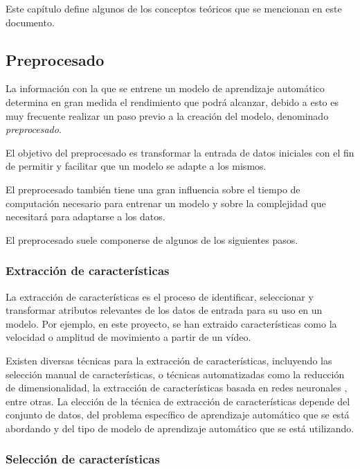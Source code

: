 \label{cha:Conceptos teóricos}

Este capítulo define algunos de los conceptos teóricos que se mencionan en este
documento.

\subsection{Preprocesado}

La información con la que se entrene un modelo de aprendizaje automático
determina en gran medida el rendimiento que podrá alcanzar, debido a esto es muy
frecuente realizar un paso previo a la creación del modelo, denominado
\textit{preprocesado}.

El objetivo del preprocesado es transformar la entrada de datos iniciales con el
fin de permitir y facilitar que un modelo se adapte a los mismos.

El preprocesado también tiene una gran influencia sobre el tiempo de computación
necesario para entrenar un modelo y sobre la complejidad que necesitará para
adaptarse a los datos.

El preprocesado suele componerse de algunos de los siguientes pasos.

\subsubsection{Extracción de características}

La extracción de características es el proceso de identificar, seleccionar y
transformar atributos relevantes de los datos de entrada para su uso en un
modelo. Por ejemplo, en este proyecto, se han extraido características como la
velocidad o amplitud de movimiento a partir de un vídeo.

Existen diversas técnicas para la extracción de características, incluyendo las
selección manual de características, o técnicas automatizadas como la reducción
de dimensionalidad, la extracción de características basada en redes neuronales
\cite{intrator1991feature}, entre otras. La elección de la técnica de extracción
de características depende del conjunto de datos, del problema específico de
aprendizaje automático que se está abordando y del tipo de modelo de aprendizaje
automático que se está utilizando.

\subsubsection{Selección de características}

